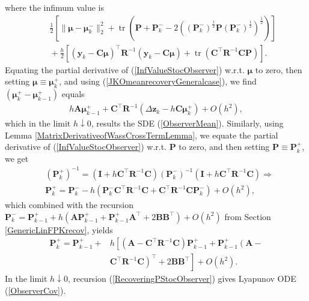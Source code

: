 \documentclass[letterpaper,10pt,twocolumn,conference]{ieeeconf}
\newcommand{\bby}{{\bm{y}}}
\newcommand{\bbz}{\bm{z}}
\newcommand{\bbmu}{\bm{\mu}}
\newcommand{\bbP}{\bm{P}}
\newcommand{\bbR}{\bm{R}}
\newcommand{\bbA}{\bm{A}}
\newcommand{\bbB}{\bm{B}}
\newcommand{\bbC}{\bm{C}}
\newcommand{\bbI}{\bm{I}}
\newcommand{\tr}{\operatorname{tr}}
\begin{document}
where the infimum value is
\begin{eqnarray}
&&\!\!\!\!\!\!\!\!\!\!\!\!\frac{1}{2}\left[\parallel\bm{\mu}\!-\!\bm{\mu}_{k}^{-}\parallel_{2}^{2} + \tr\left(\bm{P} + \bm{P}_{k}^{-}\! -\! 2 \left((\bm{P}_{k}^{-})^{\frac{1}{2}} \bm{P} (\bm{P}_{k}^{-})^{\frac{1}{2}}\right)^{\frac{1}{2}}\right)\right] \nonumber\\
&&\!\!\!\!\!\!\!\!\!\!\!\!\!+ \frac{h}{2}\left[(\bby_{k} - \bbC\bbmu)^{\top} \bbR^{-1} (\bby_{k} - \bbC\bbmu)\!+\!\tr\left(\bbC^{\top}\bbR^{-1}\bbC\bbP\right)\right].
\label{InfValueStocObserver}	
\end{eqnarray}
Equating the partial derivative of (\ref{InfValueStocObserver}) w.r.t. $\bbmu$ to zero, then setting $\bbmu\equiv\bbmu_{k}^{+}$, and using (\ref{JKOmeanrecoveryGeneralcase}), we find $(\bbmu_{k}^{+} - \bbmu_{k-1}^{+})$ equals
\begin{eqnarray}
h\bbA\bbmu_{k-1}^{+} + \bbC^{\top}\bbR^{-1}\left(\Delta\bbz_{k} - h\bbC\bbmu_{k}^{+}\right) + O(h^{2}),
\label{RecoveringMuStocObserver}	
\end{eqnarray}
which in the limit $h\downarrow 0$, results the SDE (\ref{ObserverMean}). Similarly, using Lemma \ref{MatrixDerivativeofWassCrossTermLemma}, we equate the partial derivative of (\ref{InfValueStocObserver}) w.r.t. $\bbP$ to zero, and then setting $\bbP\equiv\bbP_{k}^{+}$, we get
\begin{align*}
&(\bbP_{k}^{+})^{-1} = \left(\bbI + h\bbC^{\top}\bbR^{-1}\bbC\right)(\bbP_{k}^{-})^{-1}\left(\bbI + h\bbC^{\top}\bbR^{-1}\bbC\right)\Rightarrow\\ 
&\bbP_{k}^{+} = \bbP_{k}^{-} - h\left(\bbP_{k}^{-}\bbC^{\top}\bbR^{-1}\bbC + \bbC^{\top}\bbR^{-1}\bbC\bbP_{k}^{-}\right) + O(h^{2}),		
\end{align*}
which combined with the recursion $\bbP_{k}^{-} = \bbP_{k-1}^{+} + h(\bbA\bbP_{k-1}^{+} \allowbreak + \bbP_{k-1}^{+}\bbA^{\top} + 2\bbB\bbB^{\top}) + O(h^{2})$ from Section \ref{GenericLinFPKrecov}, yields
\begin{align}
\bbP_{k}^{+} = \bbP_{k-1}^{+} + &h\left[\left(\bbA - \bbC^{\top}\bbR^{-1}\bbC\right)\bbP_{k-1}^{+} + \bbP_{k-1}^{+}\left(\bbA - \right.\right.\nonumber\\ 
&\left.\left.\bbC^{\top}\bbR^{-1}\bbC\right)^{\top} + 2\bbB\bbB^{\top}\right] + O(h^{2}).
\label{RecoveringPStocObserver}	
\end{align}
In the limit $h\downarrow 0$, recursion (\ref{RecoveringPStocObserver}) gives Lyapunov ODE (\ref{ObserverCov}). 
\end{document}
